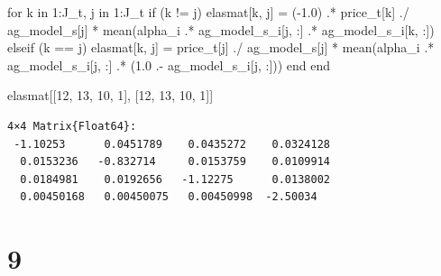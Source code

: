 \documentclass[
  letterpaper,
  DIV=11,
  numbers=noendperiod]{scrreprt}
\newenvironment{Shaded}{\begin{snugshade}}{\end{snugshade}}
\newcommand{\ControlFlowTok}[1]{\textcolor[rgb]{0.00,0.23,0.31}{#1}}
\newcommand{\FloatTok}[1]{\textcolor[rgb]{0.68,0.00,0.00}{#1}}
\newcommand{\FunctionTok}[1]{\textcolor[rgb]{0.28,0.35,0.67}{#1}}
\newcommand{\KeywordTok}[1]{\textcolor[rgb]{0.00,0.23,0.31}{#1}}
\newcommand{\NormalTok}[1]{\textcolor[rgb]{0.00,0.23,0.31}{#1}}
\newcommand{\OperatorTok}[1]{\textcolor[rgb]{0.37,0.37,0.37}{#1}}
\begin{document}
\begin{Shaded}
\begin{Highlighting}[]
\ControlFlowTok{for}\NormalTok{ k }\KeywordTok{in} \FloatTok{1}\OperatorTok{:}\NormalTok{J\_t, j }\KeywordTok{in} \FloatTok{1}\OperatorTok{:}\NormalTok{J\_t}
    \ControlFlowTok{if}\NormalTok{ (k }\OperatorTok{!=}\NormalTok{ j)}
\NormalTok{        elasmat[k, j] }\OperatorTok{=}\NormalTok{ (}\OperatorTok{{-}}\FloatTok{1.0}\NormalTok{) }\OperatorTok{.*}\NormalTok{ price\_t[k] }\OperatorTok{./}\NormalTok{ ag\_model\_s[j] }\OperatorTok{*} \FunctionTok{mean}\NormalTok{(alpha\_i }\OperatorTok{.*}\NormalTok{ ag\_model\_s\_i[j, }\OperatorTok{:}\NormalTok{] }\OperatorTok{.*}\NormalTok{ ag\_model\_s\_i[k, }\OperatorTok{:}\NormalTok{])}
    \ControlFlowTok{elseif}\NormalTok{ (k }\OperatorTok{==}\NormalTok{ j)}
\NormalTok{        elasmat[k, j] }\OperatorTok{=}\NormalTok{ price\_t[j] }\OperatorTok{./}\NormalTok{ ag\_model\_s[j] }\OperatorTok{*} \FunctionTok{mean}\NormalTok{(alpha\_i }\OperatorTok{.*}\NormalTok{ ag\_model\_s\_i[j, }\OperatorTok{:}\NormalTok{] }\OperatorTok{.*}\NormalTok{ (}\FloatTok{1.0} \OperatorTok{.{-}}\NormalTok{ ag\_model\_s\_i[j, }\OperatorTok{:}\NormalTok{]))}
    \ControlFlowTok{end}
\ControlFlowTok{end}


\NormalTok{elasmat[[}\FloatTok{12}\NormalTok{, }\FloatTok{13}\NormalTok{, }\FloatTok{10}\NormalTok{, }\FloatTok{1}\NormalTok{], [}\FloatTok{12}\NormalTok{, }\FloatTok{13}\NormalTok{, }\FloatTok{10}\NormalTok{, }\FloatTok{1}\NormalTok{]]}
\end{Highlighting}
\end{Shaded}

\begin{verbatim}
4×4 Matrix{Float64}:
 -1.10253      0.0451789    0.0435272    0.0324128
  0.0153236   -0.832714     0.0153759    0.0109914
  0.0184981    0.0192656   -1.12275      0.0138002
  0.00450168   0.00450075   0.00450998  -2.50034
\end{verbatim}

\hypertarget{section-6}{%
\section{9}\label{section-6}}
\end{document}
